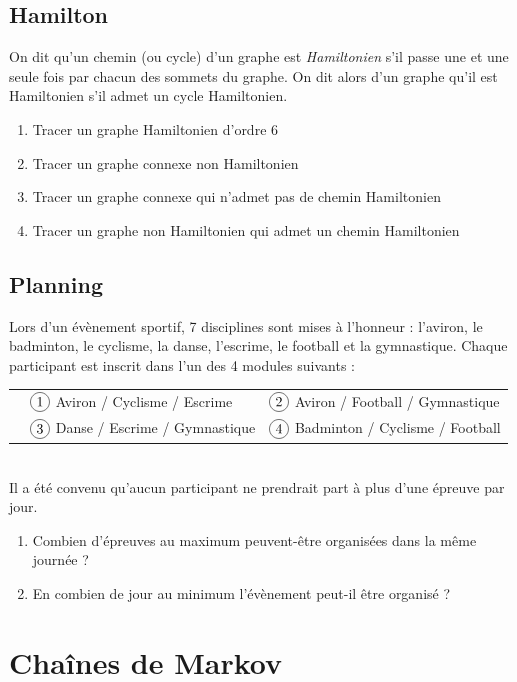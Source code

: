 \documentclass[oneside,12pt]{book}          %
\begin{document}
\subsection{Hamilton}
On dit qu'un chemin (ou cycle) d'un graphe est \textit{Hamiltonien} s'il passe une et une seule fois par chacun des sommets du graphe. On dit alors d'un graphe qu'il est Hamiltonien s'il admet un cycle Hamiltonien.
\begin{enumerate}
    \item Tracer un graphe Hamiltonien d'ordre 6
    \item Tracer un graphe connexe non Hamiltonien
    \item Tracer un graphe connexe qui n'admet pas de chemin Hamiltonien
    \item Tracer un graphe non Hamiltonien qui admet un chemin Hamiltonien
\end{enumerate}



\subsection{Planning}
Lors d'un évènement sportif, 7 disciplines sont mises à l'honneur : l'aviron, le badminton, le cyclisme, la danse, l'escrime, le football et la gymnastique. Chaque participant est inscrit dans l'un des 4 modules suivants : \\[10pt]
\begin{tabular}{p{}p{} p{}}
     & $\circled{1}$ Aviron / Cyclisme / Escrime & $\circled{2}$ Aviron / Football / Gymnastique \\[3pt]
     & $\circled{3}$ Danse / Escrime / Gymnastique & $\circled{4}$ Badminton / Cyclisme / Football
\end{tabular} \\[5pt]

Il a été convenu qu'aucun participant ne prendrait part à plus d'une épreuve par jour.
\begin{enumerate}
    \item Combien d'épreuves au maximum peuvent-être organisées dans la même journée ?
    \item En combien de jour au minimum l'évènement peut-il être organisé ?
\end{enumerate}




\section{Chaînes de Markov}
\end{document}
